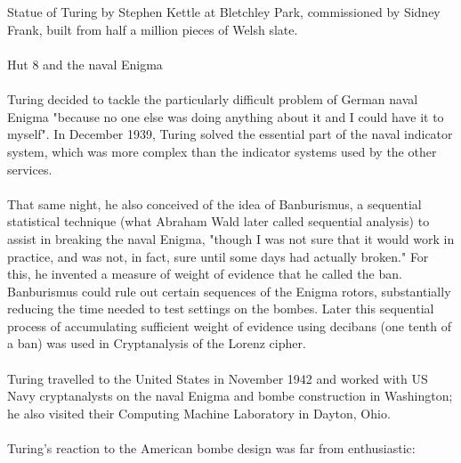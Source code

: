 \documentclass{article}
\begin{document}
\\\\
Statue of Turing by Stephen Kettle at Bletchley Park, commissioned by Sidney Frank, built from half a million pieces of Welsh slate.
\\\\
Hut 8 and the naval Enigma
\\\\
Turing decided to tackle the particularly difficult problem of German naval Enigma "because no one else was doing anything about it and I could have it to myself". In December 1939, Turing solved the essential part of the naval indicator system, which was more complex than the indicator systems used by the other services.
\\\\
That same night, he also conceived of the idea of Banburismus, a sequential statistical technique (what Abraham Wald later called sequential analysis) to assist in breaking the naval Enigma, "though I was not sure that it would work in practice, and was not, in fact, sure until some days had actually broken." For this, he invented a measure of weight of evidence that he called the ban. Banburismus could rule out certain sequences of the Enigma rotors, substantially reducing the time needed to test settings on the bombes. Later this sequential process of accumulating sufficient weight of evidence using decibans (one tenth of a ban) was used in Cryptanalysis of the Lorenz cipher.
\\\\
Turing travelled to the United States in November 1942 and worked with US Navy cryptanalysts on the naval Enigma and bombe construction in Washington; he also visited their Computing Machine Laboratory in Dayton, Ohio.
\\\\
Turing's reaction to the American bombe design was far from enthusiastic:
\\\\
\end{document}
